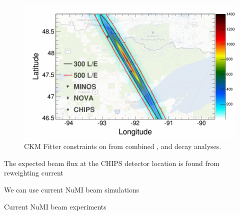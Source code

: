 \begin{figure}
    \includegraphics[width=\largefigwidth]{diagrams/numi_map}
    \caption[CKM Fitter constraints on \alphaCKM.]%
    {CKM Fitter constraints on \alphaCKM from combined \BToPiPi,
        \BToRhoPi and \BToRhoRho decay analyses.}
    \label{fig:numi_map}
\end{figure}

The expected beam flux at the CHIPS detector location is found from reweighting current

We can use current NuMI beam simulations

Current NuMI beam experiments

